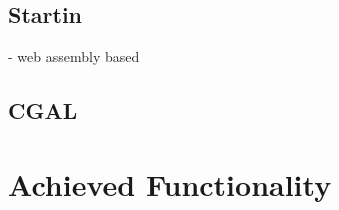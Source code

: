 


\subsection{ Startin }
- web assembly based

\subsection{ CGAL }




\section{Achieved Functionality}




